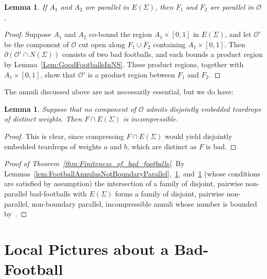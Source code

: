 \documentclass[12pt,reqno]{amsart}
\theoremstyle{plain}
\theoremstyle{definition}
\numberwithin{subcase}{case}
\theoremstyle{plain}
\newtheorem{lemm}[thm]{Lemma}
\theoremstyle{definition}
\newcommand{\OO}{\mathcal{O}}
\begin{document}
\begin{lemm}
\label{lem:FootballAnnuliNotParallel}
If $A_1$ and $A_2$ are parallel in $E(\Sigma)$, then $F_1$ and $F_2$ are parallel in $\OO$.
\label{parallelfootball}
\end{lemm}

\begin{proof}
Suppose $A_1$ and $A_2$ co-bound the region \(A_{1} \times [0,1]\) in $E(\Sigma)$, and let \(\OO'\) be the component of \(\OO\) cut open along \(F_{1} \cup F_{2}\) containing \(A_{1} \times [0,1]\).  Then \(\partial (\OO' \cap N(\Sigma))\) consists of two bad footballs, 
and each bounds a product region  by Lemma~\ref{Lem:GoodFootballsInNS}. These product regions, together with \(A_{1} \times [0,1]\), show that \(\OO'\) is a product region between \(F_{1}\) and \(F_{2}\).
\end{proof}

The annuli discussed above are not necessarily essential, but we do have:

\begin{lemm}
\label{lem:BadFootballsYieldIncompressibleAnnuli}
Suppose that no component of \(\OO\) admits disjointly embedded teardrops of distinct weights.  Then \(F \cap E(\Sigma)\) is incompressible.  
\end{lemm}

\begin{proof}
This is clear, since compressing \(F \cap E(\Sigma)\) would yield disjointly embedded teardrops of weights \(a\) and \(b\), which are distinct as \(F\) is bad.
\end{proof}

\begin{proof}[Proof of Theorem~\ref{thm:Finiteness_of_bad_footballs}]
By Lemmas~\ref{lem:FootballAnnulusNotBoundaryParallel},~\ref{lem:FootballAnnuliNotParallel}, and~\ref{lem:BadFootballsYieldIncompressibleAnnuli} (whose conditions are satisfied by assumption) the intersection of a family of disjoint, pairwise non-parallel bad-footballs with \(E(\Sigma)\) forms a family of disjoint, pairwise non-parallel, non-boundary parallel, incompressible annuli whose number is bounded by~\cite{FreedmanFreedman}.
\end{proof}


\section{Local Pictures about a Bad-Football}\label{sec:Local Pictures about a Bad-Football}
\end{document}
